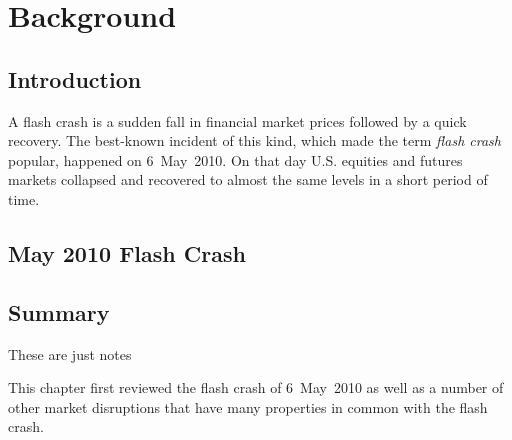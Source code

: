 %


\chapter{Background}
\label{chap:background}


\section{Introduction}

A flash crash is a sudden fall in financial market prices followed by a quick recovery.
The best-known incident of this kind, which made the term \textit{flash crash} popular, happened on 6~May~2010.
On that day U.S. equities and futures markets collapsed and recovered to almost the same levels in a short period of
time.

\section{May 2010 Flash Crash}
\label{sec:back:flash-crash-2010}


\section{Summary}
\label{sec:back:summary}

\begin{mynotes}
These are just notes
\end{mynotes}

This chapter first reviewed the flash crash of 6~May~2010 as well as a number of other market disruptions that have many properties in common with the flash crash.